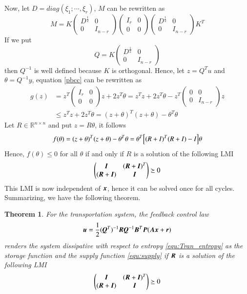 \documentclass[preprint,authoryear,12pt]{elsarticle}
\renewcommand{\vec}[1]{\mbox{\boldmath$#1$}}
\newcommand{\mat}[1]{\mbox{\boldmath$#1$}}
\newtheorem{thm}{Theorem}
\begin{document}
Now, let $D =diag(\xi_1;\cdots,\xi_r)$, $M$ can be rewritten as
$$M=K\left(\begin{array}{cc}D^{\frac{1}{2}}& 0 \\ 0 &I_{n-r} 
\end{array}\right)
\left(\begin{array}{cc}I_r& 0 \\ 0 &0 
\end{array}\right)
\left(\begin{array}{cc}D^{\frac{1}{2}}& 0 \\ 0 &I_{n-r} 
\end{array}\right)
K^T$$
If we put 
$$Q=K\left(\begin{array}{cc}D^{\frac{1}{2}}& 0 \\ 0 &I_{n-r} 
\end{array}\right)$$
then $Q^{-1}$ is well defined because $K$ is orthogonal. Hence, let $z=Q^T u$  and $\theta= Q^{-1}y$, equation \eqref{pbcc} can be rewritten as
\begin{align}\label{pbc1}
g(z)&=z^T\left(\begin{array}{cc}I_r& 0 \\ 0 &0 
\end{array}\right)z+2z^T\theta=z^T z +2z^T \theta -z^T\left(\begin{array}{cc}0& 0 \\ 0 &I_{n-r} 
\end{array}\right) z\nonumber\\
&\leq z^T z +2z^T \theta=(z+\theta)^T (z+\theta) -\theta^T \theta
\end{align}
Let $R\in\mathbb{R}^{n\times n}$ and put
$z=R\theta$, it follows
\begin{equation}\label{pbc2}
f(\theta)=(z+\theta)^T (z+\theta) -\theta^T \theta=\theta^T\Bigl[(R+I)^T(R+I)-I\Bigr]\theta
\end{equation}
Hence, $f(\theta)\leq 0$ for all $\theta$  if and only if $R$  is a solution of
  the following LMI 
$$\begin{pmatrix}
\mat{I}& (\mat{R}+\mat{I})^T  \\
 (\mat{R}+\mat{I})  & \mat{I}
\end{pmatrix}\succeq 0$$
This LMI is now independent of $\vec{x}$, hence it can be solved once for all cycles. Summarizing, we have the following theorem. 

\begin{thm}\label{thm:pbc2}
For the transportation system, the feedback control law
\begin{equation}
\label{equ:feedback2}
\vec{u}=\frac{1}{2}(\mat{Q}^T)^{-1}\mat{R}\mat{Q}^{-1}\mat{B}^T\mat{P}(\mat{A}
\vec{x}+\vec{r})
\end{equation}
renders the system dissipative with respect to
entropy \eqref{equ:Tran_entropy} as the storage function and the
supply function \eqref{equ:supply} if $\mat{R}$ is a solution of the
following LMI
$$\begin{pmatrix}
\mat{I}& (\mat{R}+\mat{I})^T  \\
 (\mat{R}+\mat{I})  & \mat{I}
\end{pmatrix}\succeq 0$$
\end{thm}
\end{document}
